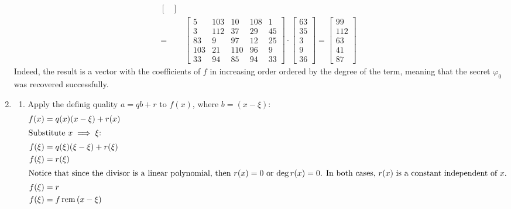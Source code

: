 \documentclass[11pt,a4paper]{article}
\begin{document}
\begin{enumerate}
\begin{align*}
\begin{bmatrix}
                                                   \end{bmatrix}               \\
              =         & \begin{bmatrix}
                              5   & 103 & 10  & 108 & 1  \\
                              3   & 112 & 37  & 29  & 45 \\
                              83  & 9   & 97  & 12  & 25 \\
                              103 & 21  & 110 & 96  & 9  \\
                              33  & 94  & 85  & 94  & 33
                          \end{bmatrix} \cdot \begin{bmatrix}
                                                  63 \\ 35 \\ 3 \\ 9 \\ 36
                                              \end{bmatrix} = \begin{bmatrix}
                                                                  99 \\ 112 \\ 63 \\ 41 \\ 87
                                                              \end{bmatrix}
          \end{align*}
          Indeed, the result is a vector with the coefficients of $f$ in increasing order ordered by the degree of the term, meaning that the
          secret $\varphi_0$ was recovered successfully.
          \newpage

    \item \begin{enumerate}
              \item Apply the definig quality $a = qb + r$ to $f(x)$, where $b = (x - \xi)$:
                    \begin{align*}
                        f(x)   & = q(x)(x - \xi) + r(x)       \\
                        \intertext{Substitute $x \implies \xi$:}
                        f(\xi) & = q(\xi)(\xi - \xi) + r(\xi) \\
                        f(\xi) & = r(\xi)                     \\
                        \intertext{Notice that since the divisor is a linear polynomial, then $r(x) = 0$ or $\deg{r(x)} = 0$. In both cases,
                            $r(x)$ is a constant independent of $x$.}
                        f(\xi) & = r                          \\
                        f(\xi) & = f\operatorname{rem}{(x - \xi)}
                    \end{align*}


\end{enumerate}
\end{enumerate}
\end{document}
